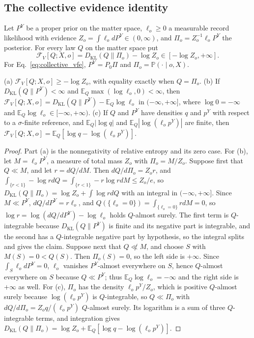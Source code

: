 \subsection{The collective evidence identity}\label{app:llp_evidence}

Let $P^Y$ be a proper prior on the matter space, $\ell_o\geq0$ a measurable record likelihood with evidence $Z_o=\int\ell_odP^Y\in(0,\infty)$, and $\Pi_o=Z_o^{-1}\ell_oP^Y$ the posterior. For every law $Q$ on the matter space put
\begin{equation}
\mathcal F_V[Q;X,o]=D_{\mathrm{KL}}(Q\|\Pi_o)-\log Z_o\in[-\log Z_o,+\infty].
\label{eq:llp_extended_vfe}
\end{equation}
For Eq.~\eqref{eq:collective_vfe}, $P^Y=P_0\Pi$ and $\Pi_o=\mathbb P(\cdot\mid o,X)$.

\begin{proposition}\label{prop:llp_evidence}
(a) $\mathcal F_V[Q;X,o]\geq-\log Z_o$, with equality exactly when $Q=\Pi_o$.
(b) If $D_{\mathrm{KL}}(Q\|P^Y)<\infty$ and $\mathbb E_Q\max(\log\ell_o,0)<\infty$, then $\mathcal F_V[Q;X,o]=D_{\mathrm{KL}}(Q\|P^Y)-\mathbb E_Q\log\ell_o$ in $(-\infty,+\infty]$, where $\log0=-\infty$ and $\mathbb E_Q\log\ell_o\in[-\infty,+\infty)$.
(c) If $Q$ and $P^Y$ have densities $q$ and $p^Y$ with respect to a $\sigma$-finite reference, and $\mathbb E_Q|\log q|$ and $\mathbb E_Q|\log(\ell_op^Y)|$ are finite, then $\mathcal F_V[Q;X,o]=\mathbb E_Q[\log q-\log(\ell_op^Y)]$.
\end{proposition}

\begin{proof}
Part (a) is the nonnegativity of relative entropy and its zero case. For (b), let $M=\ell_oP^Y$, a measure of total mass $Z_o$ with $\Pi_o=M/Z_o$. Suppose first that $Q\ll M$, and let $r=dQ/dM$. Then $dQ/d\Pi_o=Z_or$, and $\int_{\{r<1\}}-\log r dQ=\int_{\{r<1\}}-r\log r dM\leq Z_o/e$, so $D_{\mathrm{KL}}(Q\|\Pi_o)=\log Z_o+\int\log r dQ$ with an integral in $(-\infty,+\infty]$. Since $M\ll P^Y$, $dQ/dP^Y=r\ell_o$, and $Q(\{\ell_o=0\})=\int_{\{\ell_o=0\}}r dM=0$, so $\log r=\log(dQ/dP^Y)-\log\ell_o$ holds $Q$-almost surely. The first term is $Q$-integrable because $D_{\mathrm{KL}}(Q\|P^Y)$ is finite and its negative part is integrable, and the second has a $Q$-integrable negative part by hypothesis, so the integral splits and gives the claim. Suppose next that $Q\not\ll M$, and choose $S$ with $M(S)=0<Q(S)$. Then $\Pi_o(S)=0$, so the left side is $+\infty$. Since $\int_S\ell_odP^Y=0$, $\ell_o$ vanishes $P^Y$-almost everywhere on $S$, hence $Q$-almost everywhere on $S$ because $Q\ll P^Y$; thus $\mathbb E_Q\log\ell_o=-\infty$ and the right side is $+\infty$ as well. For (c), $\Pi_o$ has the density $\ell_op^Y/Z_o$, which is positive $Q$-almost surely because $\log(\ell_op^Y)$ is $Q$-integrable, so $Q\ll\Pi_o$ with $dQ/d\Pi_o=Z_oq/(\ell_op^Y)$ $Q$-almost surely. Its logarithm is a sum of three $Q$-integrable terms, and integration gives $D_{\mathrm{KL}}(Q\|\Pi_o)=\log Z_o+\mathbb E_Q[\log q-\log(\ell_op^Y)]$.
\end{proof}

